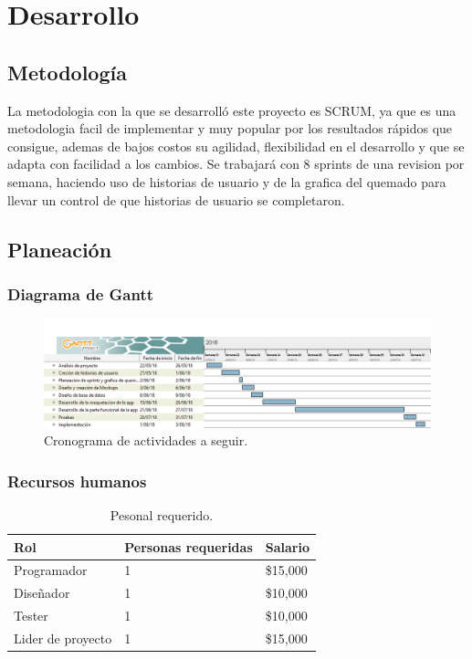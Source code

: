 \chapter{Desarrollo}
\section{Metodología}
La metodologia con la que se desarrolló este proyecto es SCRUM, ya que es una metodologia facil de implementar y muy popular por los resultados rápidos que consigue, ademas de bajos costos su agilidad, flexibilidad en el desarrollo y que se adapta con facilidad a los cambios. Se trabajará con 8 sprints de una revision por semana, haciendo uso de historias de usuario y de la grafica del quemado para llevar un control de que historias de usuario se completaron.

\section{Planeación}
\subsection{Diagrama de Gantt}
\begin{figure}[H]
	\begin{center}
		\includegraphics[scale=0.6]{img/cronograma.png} 
		\caption{Cronograma de actividades a seguir.}
		\label{gantt}
	\end{center}
\end{figure}
\subsection{Recursos humanos}
\begin{table}[H]
\centering
\begin{tabular}{|l|l|l|}
\hline
Rol               & Personas requeridas & Salario  \\ \hline
Programador       & 1                   & \$15,000 \\ \hline
Diseñador         & 1                   & \$10,000 \\ \hline
Tester            & 1                   & \$10,000 \\ \hline
Lider de proyecto & 1                   & \$15,000 \\ \hline
\end{tabular}
\caption{Pesonal requerido.}
\label{personal}
\end{table}

